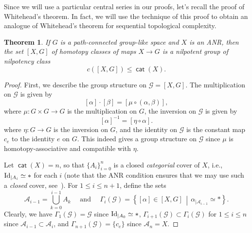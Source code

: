 \documentclass[amscd,amssymb,verbatim,10pt]{amsart}
\numberwithin{equation}{section}
\theoremstyle{plain}
\newtheorem{theorem}{Theorem}[section]
\theoremstyle{definition}
\DeclareMathOperator{\cat}{{\mathsf{cat}}}
\def\id{\protect\operatorname{Id}}
\newcommand{\cA}{{\mathcal{A}}}
\newcommand{\cG}{{\mathcal{G}}}
\begin{document}
Since we will use a particular central series in our proofs, let's recall the proof of Whitehead's theorem. In fact, we will use the technique of this proof to obtain an analogue of Whitehead's theorem for sequential topological complexity.


\begin{theorem}\label{thm:whitehead}
If $G$ is a path-connected group-like space and $X$ is an ANR, then the set $[X,G]$ of homotopy classes of maps $X\to G$ is a nilpotent group of nilpotency class 
\[
c([X,G]) \leq \cat(X).
\]
\end{theorem}
\begin{proof}
First, we describe the group structure on $\cG = [X,G]$. The multiplication on $\cG$ is given by
\[
[\alpha] \cdot [\beta] = [\mu\circ (\alpha, \beta)],
\]
where $\mu\colon G \times G \to G$ is the multiplication on $G$, the inversion on $\cG$ is given by
\[
[\alpha]^{-1}=[\eta\circ \alpha].
\]
where $\eta\colon G \to G$ is the inversion on $G$, and the identity on $\cG$ is the constant map $c_e$ to the identity $e$ on $G$. This indeed gives a group structure on $\cG$ since $\mu$ is homotopy-associative and compatible with $\eta$. 

Let $\cat(X)=n$, so that $\{A_i\}_{i=0}^n$ is a closed \emph{categorial} cover of $X$, i.e., $\id_{|A_i}\simeq\ast$ for each $i$ (note that the ANR condition ensures that we may use such a \emph{closed} cover, see~\cite[Section~1.2]{CLOT}). For $1\le i \le n+1$, define the sets
\[
\cA_{i-1} = \bigcup_{k=0}^{i-1}A_k \quad \text{ and }\quad \Gamma_i(\cG) = \left\{[\alpha]\in [X,G]\,\middle|\, \alpha_{|\cA_{i-1}} \simeq *\right\}.
\]
Clearly, we have $\Gamma_1(\cG)=\cG$ since $\id_{|A_0}\simeq\ast$,
$\Gamma_{i+1}(\cG) \subset \Gamma_i(\cG)$ for $1\le i \le n$ since $\cA_{i-1} \subset \cA_{i}$, and $\Gamma_{n+1}(\cG)=\{c_e\}$ since $\cA_n=X$. 


\end{proof}
\end{document}
